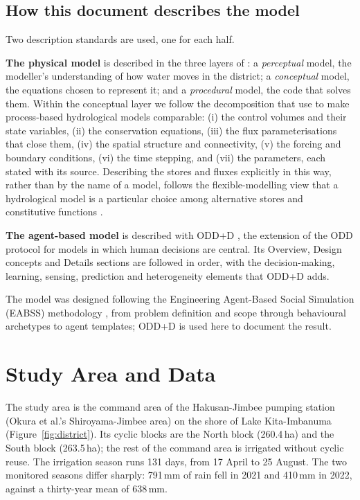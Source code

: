 \documentclass[11pt]{article}
\begin{document}
\subsection{How this document describes the model}
\label{sec:frameworks}
Two description standards are used, one for each half.

\textbf{The physical model} is described in the three layers of \citet{Beven2012}: a \emph{perceptual} model, the modeller's understanding of how water moves in the district; a \emph{conceptual} model, the equations chosen to represent it; and a \emph{procedural} model, the code that solves them. Within the conceptual layer we follow the decomposition that \citet{Clark2015} use to make process-based hydrological models comparable: (i) the control volumes and their state variables, (ii) the conservation equations, (iii) the flux parameterisations that close them, (iv) the spatial structure and connectivity, (v) the forcing and boundary conditions, (vi) the time stepping, and (vii) the parameters, each stated with its source. Describing the stores and fluxes explicitly in this way, rather than by the name of a model, follows the flexible-modelling view that a hydrological model is a particular choice among alternative stores and constitutive functions \citep{Fenicia2011Flexible}.

\textbf{The agent-based model} is described with ODD+D \citep{Mueller2013ODDD}, the extension of the ODD protocol \citep{Grimm2020ODD} for models in which human decisions are central. Its Overview, Design concepts and Details sections are followed in order, with the decision-making, learning, sensing, prediction and heterogeneity elements that ODD+D adds.

The model was designed following the Engineering Agent-Based Social Simulation (EABSS) methodology \citep{SiebersKluegl}, from problem definition and scope through behavioural archetypes to agent templates; ODD+D is used here to document the result.

\section{Study Area and Data}
\label{sec:site}

The study area is the command area of the Hakusan-Jimbee pumping station (Okura et al.'s Shiroyama-Jimbee area) on the shore of Lake Kita-Imbanuma (Figure~\ref{fig:district}). Its cyclic blocks are the North block (260.4\,ha) and the South block (263.5\,ha); the rest of the command area is irrigated without cyclic reuse. The irrigation season runs 131 days, from 17 April to 25 August. The two monitored seasons differ sharply: 791\,mm of rain fell in 2021 and 410\,mm in 2022, against a thirty-year mean of 638\,mm.
\end{document}
